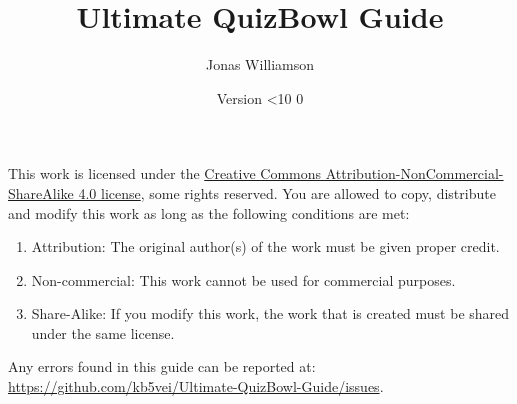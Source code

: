 \documentclass[12pt]{book}
\newcommand{\mytitle}{Ultimate QuizBowl Guide}
\newcommand\twodigits[1]{%
	\ifnum#1<10 0#1\else #1\fi
}
\begin{document}
	\frontmatter
	\title{\mytitle}

	
	\author{Jonas Williamson}
	\date{Version \the\year\twodigits{\the\month}\the\day}
	\maketitle
	\begin{center}

			\huge \cc \the\year
			\vspace{0.5 in}
			
			\byncsa
	\normalsize
		\end{center}
		\vspace{2 in}	
	This work is licensed under the \href{https://creativecommons.org/licenses/by-nc-sa/4.0/legalcode}{Creative Commons Attribution-NonCommercial-ShareAlike 4.0 license}, some rights reserved.  You are allowed to copy, distribute and modify this work as long as the following conditions are met:
	\begin{enumerate}
		\item Attribution: The original author(s) of the work must be given proper credit.
		\item Non-commercial: This work cannot be used for commercial purposes.
		\item Share-Alike: If you modify this work, the work that is created must be shared under the same license. 
	\end{enumerate}

	\vspace{1 in}
	\begin{center} Any errors found in this guide can be reported at: \\ \href{https://github.com/kb5vei/Ultimate-QuizBowl-Guide/issues}{https://github.com/kb5vei/Ultimate-QuizBowl-Guide/issues}.\end{center}

\mainmatter


	
	
	
	
	
	
	\tableofcontents
	
	






	
	







	

		
	









		
		
	
		
\end{document}
